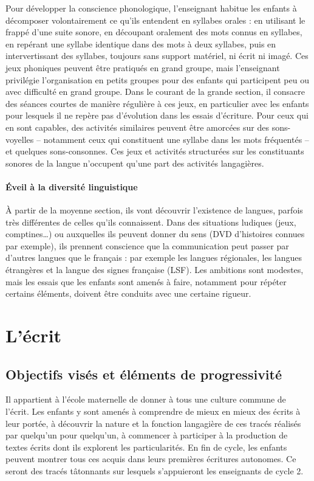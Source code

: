 Pour développer la conscience phonologique, l’enseignant habitue les enfants à décomposer volontairement ce qu’ils entendent en syllabes orales : en utilisant le frappé d’une suite sonore, en \og découpant \fg{} oralement des mots connus en syllabes, en repérant une syllabe identique dans des mots à deux syllabes, puis en intervertissant des syllabes, toujours sans support matériel, ni écrit ni imagé. Ces jeux phoniques peuvent être pratiqués en grand groupe, mais l’enseignant privilégie l’organisation en petits groupes pour des enfants qui participent peu ou avec difficulté en grand groupe. Dans le courant de la grande section, il consacre des séances courtes de manière régulière à ces jeux, en particulier avec les enfants pour lesquels il ne repère pas d’évolution dans les essais d’écriture. Pour ceux qui en sont capables, des activités similaires peuvent être amorcées sur des sons-voyelles -- notamment ceux qui constituent une syllabe dans les mots fréquentés -- et quelques sons-consonnes. Ces jeux et activités structurées sur les constituants sonores de la langue n’occupent qu’une part des activités langagières.
 
\paragraph{Éveil à la diversité linguistique}
À partir de la moyenne section, ils vont découvrir l’existence de langues, parfois très différentes de celles qu’ils connaissent. Dans des situations ludiques (jeux, comptines\dots) ou auxquelles ils peuvent donner du sens (DVD d’histoires connues par exemple), ils prennent conscience que la communication peut passer par d’autres langues que le français : par exemple les langues régionales, les langues étrangères et la langue des signes française (LSF). Les ambitions sont modestes, mais les essais que les enfants sont amenés à faire, notamment pour répéter certains éléments, doivent être conduits avec une certaine rigueur. 

\section{L’écrit}
\subsection{Objectifs visés et éléments de progressivité} 
Il appartient à l’école maternelle de donner à tous une culture commune de l’écrit. Les enfants y sont amenés à comprendre de mieux en mieux des écrits à leur portée, à découvrir la nature et la fonction langagière de ces tracés réalisés par quelqu’un pour quelqu’un, à commencer à participer à la production de textes écrits dont ils explorent les particularités. En fin de cycle, les enfants peuvent montrer tous ces acquis dans leurs premières écritures autonomes. Ce seront des tracés tâtonnants sur lesquels s’appuieront les enseignants de cycle 2. 

